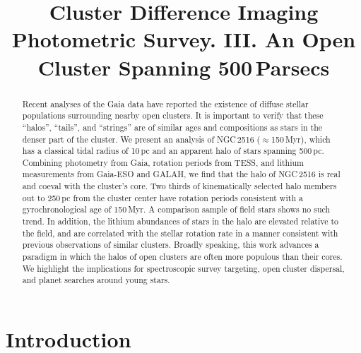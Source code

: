 \documentclass[12pt,twocolumn,tighten]{aastex63}
\begin{document}

\title{
  Cluster Difference Imaging Photometric Survey. III.
  An Open Cluster Spanning 500\,Parsecs
}



%
%
\begin{abstract}
  Recent analyses of the Gaia data have reported the existence of
  diffuse stellar populations surrounding nearby open clusters.  It is
  important to verify that these ``halos'', ``tails'', and ``strings''
  are of similar ages and compositions as stars in the denser part of
  the cluster.  We present an analysis of NGC\,2516
  ($\approx$150\,Myr), which has a classical tidal radius of 10\,pc
  and an apparent halo of stars spanning 500\,pc.  Combining
  photometry from Gaia, rotation periods from TESS, and lithium
  measurements from Gaia-ESO and GALAH, we find that the halo of
  NGC\,2516 is real and coeval with the cluster's core.  Two thirds of
  kinematically selected halo members out to 250\,pc from the cluster
  center have rotation periods consistent with a gyrochronological age
  of 150\,Myr.  A comparison sample of field stars shows no such
  trend.  In addition, the lithium abundances of stars in the halo are
  elevated relative to the field, and are correlated with the stellar
  rotation rate in a manner consistent with previous observations of
  similar clusters.  Broadly speaking, this work advances a paradigm
  in which the halos of open clusters are often more populous than
  their cores.  We highlight the implications for spectroscopic survey
  targeting, open cluster dispersal, and planet searches around young
  stars.
\end{abstract}




\section{Introduction}
\end{document}
